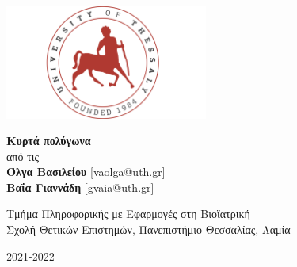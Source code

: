 
\begin{titlepage}

\begin{center}

\includegraphics[width=0.5\textwidth]{images/uthlogo}\\
\vspace{3em}

\Large \textbf {Κυρτά πολύγωνα}\\
\vspace{1.5em}
\normalsize από τις \\
\vspace{1.5em}
\textup{\small {\bf Όλγα Βασιλείου} [\textlatin{\href{mailto:vaolga@uth.gr}{vaolga@uth.gr}}]\\ \vspace{.5em} {\bf Βαΐα Γιαννάδη} [\textlatin{\href{mailto:gvaia@uth.gr}{gvaia@uth.gr}}]}

\vspace{4in}
Τμήμα Πληροφορικής με Εφαρμογές στη Βιοϊατρική \\
Σχολή Θετικών Επιστημών, Πανεπιστήμιο Θεσσαλίας, Λαμία
\vspace{2em}

\vfill
2021-2022

\end{center}

\end{titlepage}